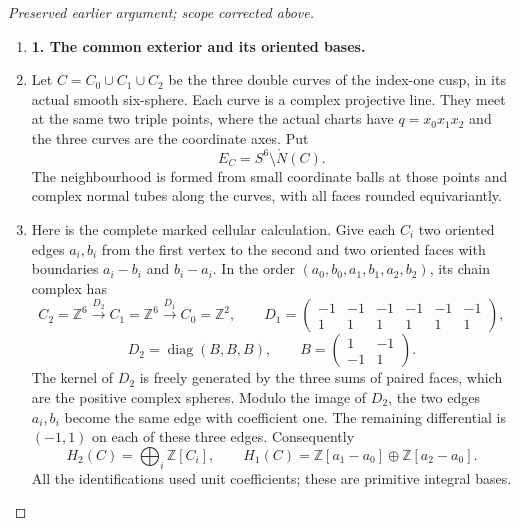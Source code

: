 \begin{proof}[Preserved earlier argument; scope corrected above]
\begin{enumerate}[label=\arabic*.]
\item \par\medskip\noindent\textbf{1. The common exterior and its oriented bases.}\enspace

\item Let \(C=C_0\cup C_1\cup C_2\) be the three double curves of the
index-one cusp, in its actual smooth six-sphere. Each curve is a
complex projective line. They meet at the same two triple points,
where the actual charts have \(q=x_0x_1x_2\) and the three curves
are the coordinate axes. Put
\[
 E_C=S^6\setminus\mathring N(C).
\]
The neighbourhood is formed from small coordinate balls at those
points and complex normal tubes along the curves, with all faces
rounded equivariantly.

\item Here is the complete marked cellular calculation. Give each
\(C_i\) two oriented edges \(a_i,b_i\) from the first vertex
to the second and two oriented faces with boundaries
\(a_i-b_i\) and \(b_i-a_i\). In the order
\((a_0,b_0,a_1,b_1,a_2,b_2)\), its chain complex has
\[
 C_2=\mathbb Z^6\xrightarrow{D_2}C_1=\mathbb Z^6
                      \xrightarrow{D_1}C_0=\mathbb Z^2,
 \qquad
 D_1=\begin{pmatrix}-1&-1&-1&-1&-1&-1\\
                     1&1&1&1&1&1\end{pmatrix},
\]
\[
 D_2=\operatorname{diag}(B,B,B),\qquad
               B=\begin{pmatrix}1&-1\\-1&1\end{pmatrix}.
\]
The kernel of \(D_2\) is freely generated by the three
sums of paired faces, which are the positive complex
spheres. Modulo the image of \(D_2\), the two edges
\(a_i,b_i\) become the same edge with coefficient one.
The remaining differential is
\((-1,1)\) on each of these three edges. Consequently
\[
 H_2(C)=\bigoplus_i\mathbb Z[C_i],\qquad
 H_1(C)=\mathbb Z[a_1-a_0]\oplus\mathbb Z[a_2-a_0].
\]
All the identifications used unit coefficients; these
are primitive integral bases.


\end{enumerate}
\end{proof}

